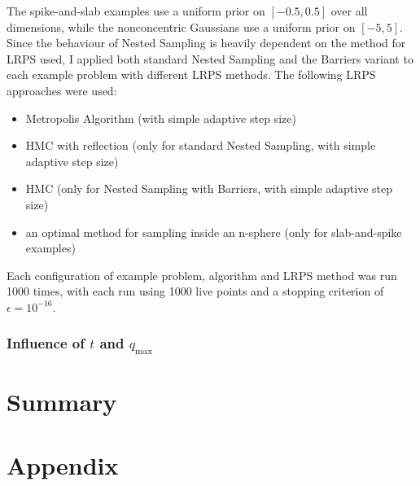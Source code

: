 \documentclass[12pt, a4paper]{report}
\begin{document}
The spike-and-slab examples use a uniform prior on $[-0.5, 0.5]$ over all dimensions, while the nonconcentric Gaussians use a uniform prior on $[-5, 5]$.
Since the behaviour of Nested Sampling is heavily dependent on the method for LRPS used, I applied both standard Nested Sampling and the Barriers variant to each example problem with different LRPS methods.
The following LRPS approaches were used:
\begin{itemize}
    \item Metropolis Algorithm (with simple adaptive step size)
    \item HMC with reflection (only for standard Nested Sampling, with simple adaptive step size)
    \item HMC (only for Nested Sampling with Barriers, with simple adaptive step size)
    \item an optimal method for sampling inside an n-sphere (only for slab-and-spike examples)
\end{itemize}
Each configuration of example problem, algorithm and LRPS method was run 1000 times, with each run using 1000 live points and a stopping criterion of $\epsilon = 10^{-16}$.


\subsection{Influence of $t$ and $q_{\textrm{max}}$}

\chapter{Summary}

\clearpage
\printbibliography
{}

\clearpage
\chapter*{Appendix}
\end{document}
